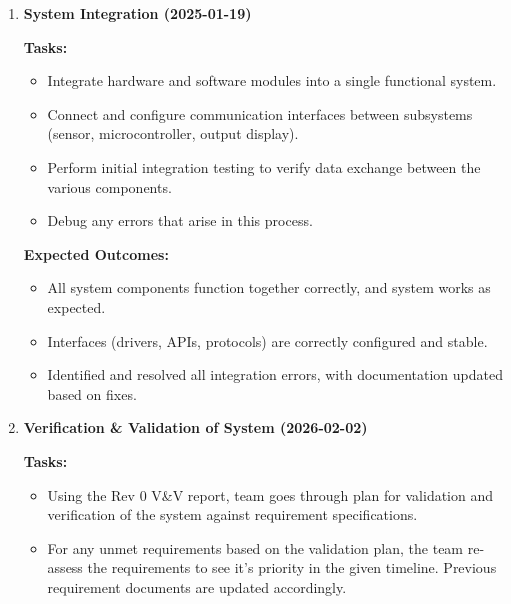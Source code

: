 \documentclass[12pt]{article}
\theoremstyle{definition}
\begin{document}
\begin{enumerate}
  \textbf{Expected Outcomes:}
  \begin{itemize}
      \item Each focus area has a fully completed design plan based on the
      investigation completed by the expert. 
      \item The plan has been written in Rev 0 of the Design Document.
      \item Prototyping for features in focus areas has been completed, and
      validated by the rest of the team. 
  \end{itemize}

  \vspace{0.8em}

\item \textbf{System Integration (2025-01-19)}  

  \textbf{Tasks:}
  \begin{itemize}
      \item Integrate hardware and software modules into a single functional
      system. 
      \item Connect and configure communication interfaces between subsystems
      (sensor, microcontroller, output display). 
      \item Perform initial integration testing to verify data exchange between
      the various components. 
      \item Debug any errors that arise in this process. 
  \end{itemize}

  \textbf{Expected Outcomes:}
  \begin{itemize}
      \item All system components function together correctly, and system works
      as expected. 
      \item Interfaces (drivers, APIs, protocols) are correctly configured and
      stable. 
      \item Identified and resolved all integration errors, with documentation
      updated based on fixes. 
  \end{itemize}

  \vspace{0.8em}


  \item \textbf{Verification \& Validation of System (2026-02-02)}  

  \textbf{Tasks:}
  \begin{itemize}
      \item Using the Rev 0 V\&V report, team goes through plan for validation
      and verification of the system against requirement specifications. 
      \item For any unmet requirements based on the validation plan, the team
      re-assess the requirements to see it's priority in the given timeline.
      Previous requirement documents are updated accordingly. 
  \end{itemize}


\end{enumerate}
\end{document}
